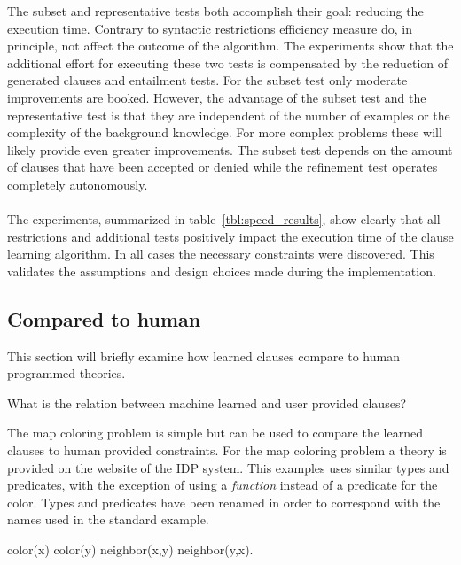 The subset and representative tests both accomplish their goal: reducing the execution time.
Contrary to syntactic restrictions efficiency measure do, in principle, not affect the outcome of the algorithm.
The experiments show that the additional effort for executing these two tests is compensated by the reduction of generated clauses and entailment tests.
For the subset test only moderate improvements are booked.
However, the advantage of the subset test and the representative test is that they are independent of the number of examples or the complexity of the background knowledge.
For more complex problems these will likely provide even greater improvements.
The subset test depends on the amount of clauses that have been accepted or denied while the refinement test operates completely autonomously.
\\\\
The experiments, summarized in table~\ref{tbl:speed_results}, show clearly that all restrictions and additional tests positively impact the execution time of the clause learning algorithm.
In all cases the necessary constraints were discovered.
This validates the assumptions and design choices made during the implementation.


\subsection{Compared to human}

This section will briefly examine how learned clauses compare to human programmed theories.

\begin{question}
	What is the relation between machine learned and user provided clauses?
\end{question}

\begin{observation}
\label{exp:cd_user_show}
	The map coloring problem is simple but can be used to compare the learned clauses to human provided constraints.
	For the map coloring problem a theory is provided on the website of the IDP system.
	This examples uses similar types and predicates, with the exception of using a \emph{function} instead of a predicate for the color.
	Types and predicates have been renamed in order to correspond with the names used in the standard example.  
	\begin{shiftedflalign*}
		color(x) \neq color(y) \leftarrow neighbor(x,y) \lor neighbor(y,x).
	\end{shiftedflalign*}

\end{observation}

